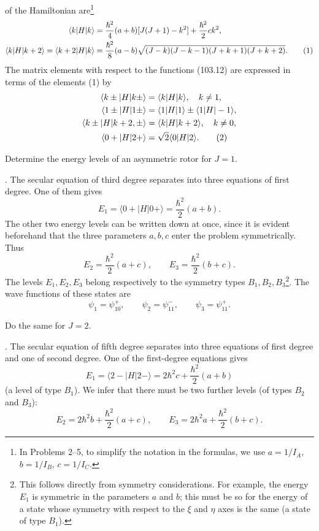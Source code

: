 of the Hamiltonian are\footnote{In Problems 2--5, to simplify the notation in the formulas, we use $a=1/I_A$, $b=1/I_B$, $c=1/I_C$.}
\begin{align}
 \langle k|H|k\rangle&=\frac{\hbar^2}{4}(a+b)[J(J+1)-k^2]+\frac{\hbar^2}{2}ck^2,\notag\\
 \langle k|H|k+2\rangle=\langle k+2|H|k\rangle&=\frac{\hbar^2}{8}(a-b)\sqrt{(J-k)(J-k-1)(J+k+1)(J+k+2)}. \tag{1}
\end{align}
The matrix elements with respect to the functions (103.12) are expressed in terms of the elements (1) by
\begin{align}
 \langle k\pm|H|k\pm\rangle&=\langle k|H|k\rangle,\quad k\ne1,\notag\\
 \langle1\pm|H|1\pm\rangle&=\langle1|H|1\rangle\pm\langle1|H|-1\rangle,\notag\\
 \langle k\pm|H|k+2,\pm\rangle&=\langle k|H|k+2\rangle,\quad k\ne0,\notag\\
 \langle0+|H|2+\rangle&=\sqrt2\langle0|H|2\rangle. \tag{2}
\end{align}

 Determine the energy levels of an asymmetric rotor for $J=1$.

\SolutionHeading. The secular equation of third degree separates into three equations of first degree. One of them gives
\begin{equation}
 E_1=\langle0+|H|0+\rangle=\frac{\hbar^2}{2}(a+b). \tag{3}
\end{equation}
The other two energy levels can be written down at once, since it is evident beforehand that the three parameters $a,b,c$ enter the problem symmetrically. Thus
\begin{equation}
 E_2=\frac{\hbar^2}{2}(a+c),\qquad E_3=\frac{\hbar^2}{2}(b+c). \tag{4}
\end{equation}
The levels $E_1,E_2,E_3$ belong respectively to the symmetry types $B_1,B_2,B_3$\footnote{This follows directly from symmetry considerations. For example, the energy $E_1$ is symmetric in the parameters $a$ and $b$; this must be so for the energy of a state whose symmetry with respect to the $\xi$ and $\eta$ axes is the same (a state of type $B_1$).}. The wave functions of these states are
\[
 \psi_1=\psi_{10}^+,\qquad \psi_2=\psi_{11}^-,\qquad \psi_3=\psi_{11}^+.
\]

 Do the same for $J=2$.

\SolutionHeading. The secular equation of fifth degree separates into three equations of first degree and one of second degree. One of the first-degree equations gives
\begin{equation}
 E_1=\langle2-|H|2-\rangle=2\hbar^2c+\frac{\hbar^2}{2}(a+b) \tag{5}
\end{equation}
(a level of type $B_1$). We infer that there must be two further levels (of types $B_2$ and $B_3$):
\[
 E_2=2\hbar^2b+\frac{\hbar^2}{2}(a+c),\qquad E_3=2\hbar^2a+\frac{\hbar^2}{2}(b+c).
\]

